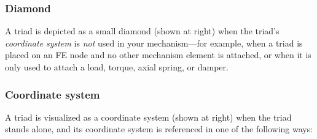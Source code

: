 
\clearpage
\noindent
\begin{minipage}{0.6\textwidth}
  \raggedright

\subsubsection{Diamond}

A triad is depicted as a small diamond (shown at right) when the triad's
{\sl coordinate system} is {\sl not} used in your mechanism---for example,
when a triad is placed on an FE node and no other mechanism element is attached,
or when it is only used to attach a load, torque, axial spring, or damper.

\subsubsection{Coordinate system}

A triad is visualized as a coordinate system (shown at right) when the triad
stands alone, and its coordinate system is referenced in one of the
following ways:
\end{minipage}%
